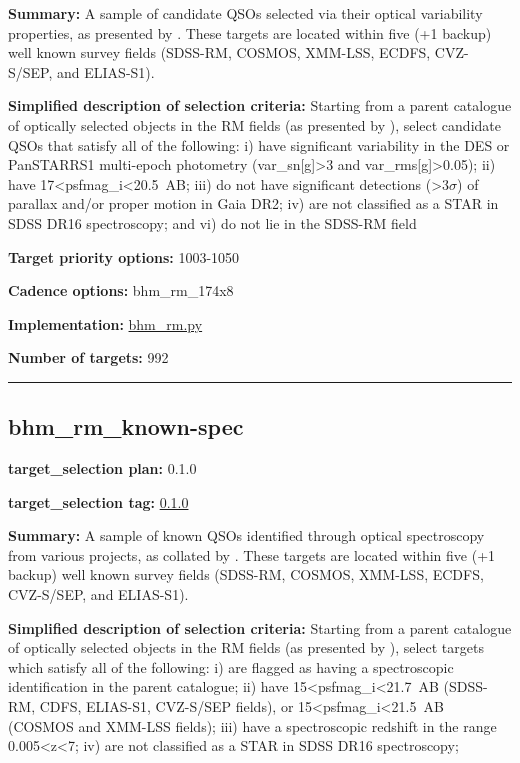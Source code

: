 \noindent\textbf{Summary:} A sample of candidate QSOs selected via their optical
variability properties, as presented by
\citet{Yang2022}. These targets are located within five (+1 backup) well
known survey fields (SDSS-RM, COSMOS, XMM-LSS, ECDFS, CVZ-S/SEP, and
ELIAS-S1).

\noindent\textbf{Simplified description of selection criteria:} Starting from a
parent catalogue of optically selected objects in the RM fields (as
presented by
\citealt{Yang2022}), select candidate QSOs that satisfy all of the
following: i) have significant variability in the DES or PanSTARRS1
multi-epoch photometry (var\_sn{[}g{]}\textgreater3 and
var\_rms{[}g{]}\textgreater0.05); ii) have
17\textless psfmag\_i\textless20.5~AB; iii) do not have significant
detections (\textgreater3$\sigma$) of parallax and/or proper motion in Gaia
DR2; iv) are not classified as a STAR in SDSS DR16 spectroscopy; and vi)
do not lie in the SDSS-RM field


\noindent\textbf{Target priority options:} 1003-1050

\noindent\textbf{Cadence options:} bhm\_rm\_174x8

\noindent\textbf{Implementation:}
\href{https://github.com/sdss/target_selection/blob/0.1.0/python/target_selection/cartons/bhm_rm.py}{bhm\_rm.py}

\noindent\textbf{Number of targets:} 992

\begin{center}\rule{0.5\linewidth}{0.5pt}\end{center}

\hypertarget{bhm_rm_known-spec_plan0.1.0}{%
\subsection{bhm\_rm\_known-spec}\label{bhm_rm_known-spec_plan0.1.0}}

\noindent\textbf{target\_selection plan:} 0.1.0

\noindent\textbf{target\_selection tag:}
\href{https://github.com/sdss/target_selection/tree/0.1.0/}{0.1.0}

\noindent\textbf{Summary:} A sample of known QSOs identified through optical
spectroscopy from various projects, as collated by
\citet{Yang2022}. These targets are located within five (+1 backup) well
known survey fields (SDSS-RM, COSMOS, XMM-LSS, ECDFS, CVZ-S/SEP, and
ELIAS-S1).

\noindent\textbf{Simplified description of selection criteria:} Starting from a
parent catalogue of optically selected objects in the RM fields (as
presented by
\citealt{Yang2022}), select targets which satisfy all of the following: i)
are flagged as having a spectroscopic identification in the parent
catalogue; ii) have 15\textless psfmag\_i\textless21.7~AB (SDSS-RM,
CDFS, ELIAS-S1, CVZ-S/SEP fields), or
15\textless psfmag\_i\textless21.5~AB (COSMOS and XMM-LSS fields); iii)
have a spectroscopic redshift in the range 0.005\textless z\textless7;
iv) are not classified as a STAR in SDSS DR16 spectroscopy;


